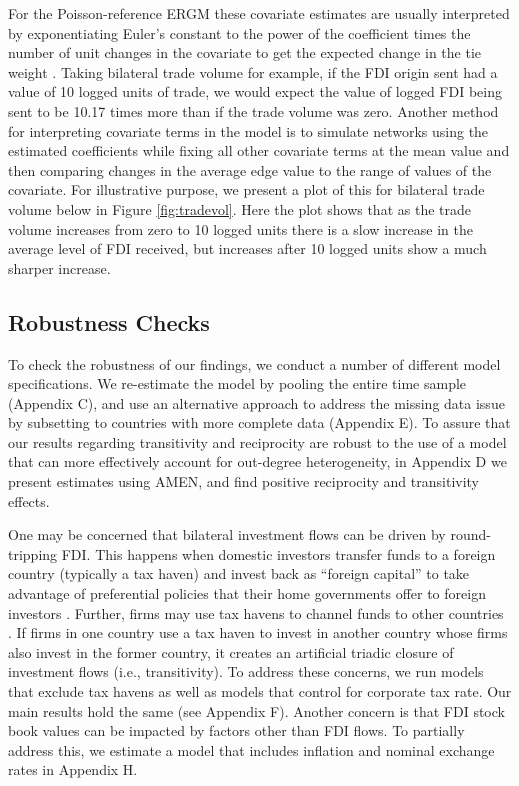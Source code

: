 \documentclass[reqno,onecolumn,letterpaper,12pt]{article}
\begin{document}
For the Poisson-reference ERGM these covariate estimates are usually interpreted by exponentiating Euler's constant to the power of the coefficient times the number of unit changes in the covariate to get the expected change in the tie weight \citep{krivitsky2013modeling}. Taking bilateral trade volume for example, if the FDI origin sent had a value of 10 logged units of trade, we would expect the value of logged FDI being sent to be 10.17 times more than if the trade volume was zero. Another method for interpreting covariate terms in the model is to simulate networks using the estimated coefficients while fixing all other covariate terms at the mean value and then comparing changes in the average edge value to the range of values of the covariate. For illustrative purpose, we present a plot of this for bilateral trade volume below in Figure \ref{fig:tradevol}. Here the plot shows that as the trade volume increases from zero to 10 logged units there is a slow increase in the average level of FDI received, but increases after 10 logged units show a much sharper increase.

\subsection{Robustness Checks}\label{robust}

To check the robustness of our findings, we conduct a number of different model specifications. We re-estimate the model by pooling the entire time sample (Appendix C), and use an alternative approach to address the missing data issue by subsetting to countries with more complete data (Appendix E). To assure that our results regarding transitivity and reciprocity are robust to the use of a model that can more effectively account for out-degree heterogeneity, in Appendix D we present estimates using AMEN, and find positive reciprocity and transitivity effects. 

One may be concerned that bilateral investment flows can be driven by round-tripping FDI. This happens when domestic investors transfer funds to a foreign country (typically a tax haven) and invest back as ``foreign capital'' to take advantage of preferential policies that their home governments offer to foreign investors \citep{Borga:2016}. Further, firms may use tax havens to channel funds to other countries \citep{Borga:2017}. If firms in one country use a tax haven to invest in another country whose firms also invest in the former country, it creates an artificial triadic closure of investment flows (i.e., transitivity). To address these concerns, we run models that exclude tax havens as well as models that control for corporate tax rate. Our main results hold the same (see Appendix F). Another concern is that FDI stock book values can be impacted by factors other than FDI flows. To partially address this, we estimate a model that includes inflation and nominal exchange rates in Appendix H.
\end{document}
